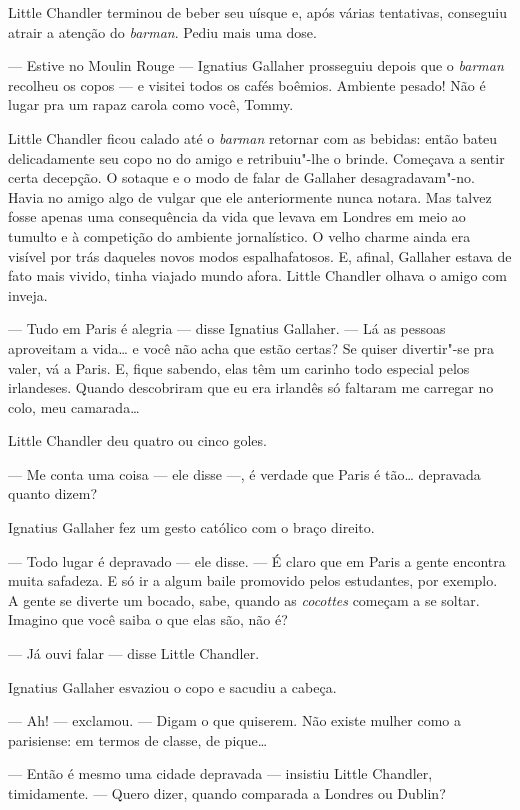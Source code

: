 Little Chandler terminou de beber seu uísque e, após várias tentativas,
conseguiu atrair a atenção do \textit{barman}.  Pediu mais uma dose.

--- Estive no Moulin Rouge --- Ignatius Gallaher prosseguiu depois que o
\textit{barman} recolheu os copos --- e visitei todos os cafés boêmios.
Ambiente pesado!  Não é lugar pra um rapaz carola como você, Tommy.

Little Chandler ficou calado até o \textit{barman} retornar com as bebidas:
então bateu delicadamente seu copo no do amigo e retribuiu"-lhe o brinde.
Começava a sentir certa decepção.  O sotaque e o modo de falar de Gallaher
desagradavam"-no.  Havia no amigo algo de vulgar que ele anteriormente nunca
notara.  Mas talvez fosse apenas uma consequência da vida que levava em Londres
em meio ao tumulto e à competição do ambiente jornalístico.  O velho charme
ainda era visível por trás daqueles novos modos espalhafatosos.  E, afinal,
Gallaher estava de fato mais vivido, tinha viajado mundo afora.  Little
Chandler olhava o amigo com inveja.

--- Tudo em Paris é alegria --- disse Ignatius Gallaher.  --- Lá as pessoas
aproveitam a vida\ldots{} e você não acha que estão certas?  Se quiser
divertir"-se pra valer, vá a Paris.  E, fique sabendo, elas têm um carinho todo
especial pelos irlandeses.  Quando descobriram que eu era irlandês só faltaram
me carregar no colo, meu camarada\ldots{}

Little Chandler deu quatro ou cinco goles.

--- Me conta uma coisa --- ele disse ---, é verdade que Paris é tão\ldots{}
depravada quanto dizem?

Ignatius Gallaher fez um gesto católico com o braço direito.

--- Todo lugar é depravado --- ele disse.  --- É claro que em Paris a gente
encontra muita safadeza.  E só ir a algum baile promovido pelos estudantes, por
exemplo.  A gente se diverte um bocado, sabe, quando as \textit{cocottes}
começam a se soltar.  Imagino que você saiba o que elas são, não é?

--- Já ouvi falar --- disse Little Chandler.

Ignatius Gallaher esvaziou o copo e sacudiu a cabeça.

--- Ah! --- exclamou.  --- Digam o que quiserem.  Não existe mulher como a
parisiense: em termos de classe, de pique\ldots{}

--- Então é mesmo uma cidade depravada --- insistiu Little Chandler,
timidamente.  --- Quero dizer, quando comparada a Londres ou Dublin?

